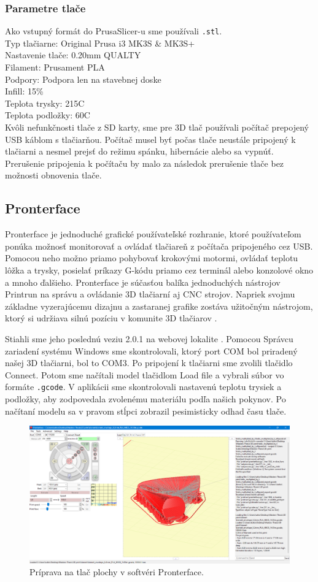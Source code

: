 \subsubsection{Parametre tlače}
Ako vstupný formát do PrusaSlicer-u sme používali \verb|.stl|. \\
Typ tlačiarne: Original Prusa i3 MK3S \& MK3S+ \\
Nastavenie tlače: 0.20mm QUALTY \\
Filament: Prusament PLA \\
Podpory: Podpora len na stavebnej doske \\
Infill: 15\% \\
Teplota trysky: 215\textdegree{}C \\
Teplota podložky: 60\textdegree{}C \\
Kvôli nefunkčnosti tlače z SD karty, sme pre 3D tlač používali počítač prepojený USB káblom s tlačiarňou. Počítač musel byť počas tlače neustále pripojený k tlačiarni a nesmel prejsť do režimu spánku, hibernácie alebo sa vypnúť. Prerušenie pripojenia k počítaču by malo za následok prerušenie tlače bez možnosti obnovenia tlače. 

\subsection{Pronterface}
Pronterface je jednoduché grafické používateľské rozhranie, ktoré používateľom ponúka možnosť monitorovať a ovládať tlačiareň z počítača pripojeného cez USB. Pomocou neho možno priamo pohybovať krokovými motormi, ovládať teplotu lôžka a trysky, posielať príkazy G-kódu priamo cez terminál alebo konzolové okno a mnoho ďalšieho. Pronterface je súčasťou balíka jednoduchých nástrojov Printrun na správu a ovládanie 3D tlačiarní aj CNC strojov. Napriek svojmu základne vyzerajúcemu dizajnu a zastaranej grafike zostáva užitočným nástrojom, ktorý si udržiava silnú pozíciu v komunite 3D tlačiarov \cite{Prontersetup}. 

Stiahli sme jeho poslednú veziu 2.0.1 na webovej lokalite \cite{Pronterface}. Pomocou Správcu zariadení systému Windows sme skontrolovali, ktorý port COM bol priradený našej 3D tlačiarni, bol to COM3. Po pripojení k tlačiarni sme zvolili tlačidlo Connect. Potom sme načítali model tlačidlom Load file a vybrali súbor vo formáte \verb|.gcode|. V aplikácii sme skontrolovali nastavenú teplotu trysiek a podložky, aby zodpovedala zvolenému materiálu podľa našich pokynov. Po načítaní modelu sa v pravom stĺpci zobrazil pesimisticky odhad času tlače.

\begin{figure}[h!]
	\centering
	\includegraphics[width=\textwidth]{images/pronterface.png}
	\caption[Softvér Pronterface.]{Príprava na tlač plochy v softvéri Pronterface.}
	\label{fig:pronterface}
\end{figure}
